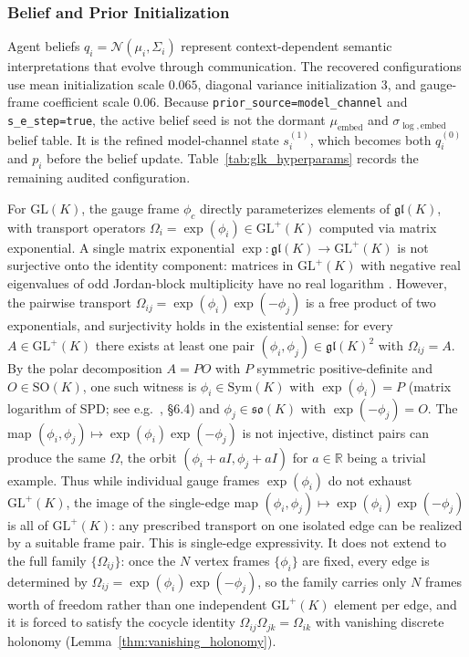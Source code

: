 \documentclass[twoside,11pt]{article}
\begin{document}
\subsubsection{Belief and Prior Initialization}

Agent beliefs $q_i = \mathcal{N}(\mu_i, \Sigma_i)$ represent context-dependent semantic interpretations that evolve through communication. The recovered configurations use mean initialization scale $0.065$, diagonal variance initialization $3$, and gauge-frame coefficient scale $0.06$. Because \texttt{prior\_source=model\_channel} and \texttt{s\_e\_step=true}, the active belief seed is not the dormant $\mu_{\mathrm{embed}}$ and $\sigma_{\log,\mathrm{embed}}$ belief table. It is the refined model-channel state $s_i^{(1)}$, which becomes both $q_i^{(0)}$ and $p_i$ before the belief update. Table~\ref{tab:glk_hyperparams} records the remaining audited configuration.

For $\mathrm{GL}(K)$, the gauge frame $\phi_c$ directly parameterizes elements of $\mathfrak{gl}(K)$, with transport operators $\Omega_i = \exp(\phi_i) \in \mathrm{GL}^+(K)$ computed via matrix exponential. A single matrix exponential $\exp: \mathfrak{gl}(K) \to \mathrm{GL}^+(K)$ is not surjective onto the identity component: matrices in $\mathrm{GL}^+(K)$ with negative real eigenvalues of odd Jordan-block multiplicity have no real logarithm \citep{culver1966existence}. However, the pairwise transport $\Omega_{ij} = \exp(\phi_i)\exp(-\phi_j)$ is a free product of two exponentials, and surjectivity holds in the existential sense: for every $A \in \mathrm{GL}^+(K)$ there exists at least one pair $(\phi_i, \phi_j) \in \mathfrak{gl}(K)^2$ with $\Omega_{ij} = A$. By the polar decomposition $A = PO$ with $P$ symmetric positive-definite and $O \in \mathrm{SO}(K)$, one such witness is $\phi_i \in \mathrm{Sym}(K)$ with $\exp(\phi_i) = P$ (matrix logarithm of SPD; see e.g.~\citet{Higham2008}, \S6.4) and $\phi_j \in \mathfrak{so}(K)$ with $\exp(-\phi_j) = O$. The map $(\phi_i, \phi_j) \mapsto \exp(\phi_i)\exp(-\phi_j)$ is not injective, distinct pairs can produce the same $\Omega$, the orbit $(\phi_i + aI, \phi_j + aI)$ for $a \in \mathbb{R}$ being a trivial example. Thus while individual gauge frames $\exp(\phi_i)$ do not exhaust $\mathrm{GL}^+(K)$, the image of the single-edge map $(\phi_i, \phi_j) \mapsto \exp(\phi_i)\exp(-\phi_j)$ is all of $\mathrm{GL}^+(K)$: any prescribed transport on one isolated edge can be realized by a suitable frame pair. This is single-edge expressivity. It does not extend to the full family $\{\Omega_{ij}\}$: once the $N$ vertex frames $\{\phi_i\}$ are fixed, every edge is determined by $\Omega_{ij} = \exp(\phi_i)\exp(-\phi_j)$, so the family carries only $N$ frames worth of freedom rather than one independent $\mathrm{GL}^+(K)$ element per edge, and it is forced to satisfy the cocycle identity $\Omega_{ij}\Omega_{jk} = \Omega_{ik}$ with vanishing discrete holonomy (Lemma~\ref{thm:vanishing_holonomy}).
\end{document}
